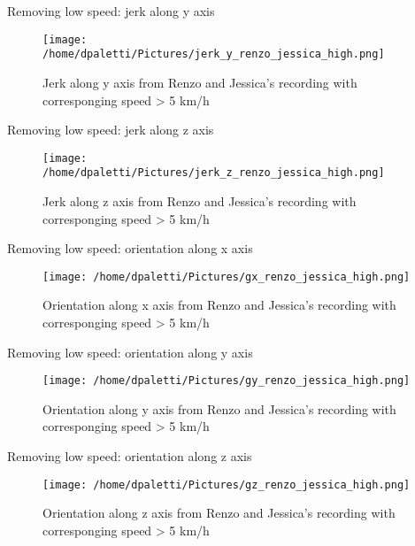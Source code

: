\documentclass[presentation]{beamer}
\begin{document}
\begin{frame}[label={sec:orgcf035dd}]{Removing low speed: jerk along y axis}
\begin{figure}[htbp]
\centering
\texttt{[image: /home/dpaletti/Pictures/jerk\_y\_renzo\_jessica\_high.png]}
\caption{\label{fig:speed_alberto_jessica}Jerk along y axis from Renzo and Jessica's recording with corresponging speed > 5 km/h}
\end{figure}
\end{frame}
\begin{frame}[label={sec:orgcaeba0c}]{Removing low speed: jerk along z axis}
\begin{figure}[htbp]
\centering
\texttt{[image: /home/dpaletti/Pictures/jerk\_z\_renzo\_jessica\_high.png]}
\caption{\label{fig:speed_alberto_jessica}Jerk along z axis from Renzo and Jessica's recording with corresponging speed > 5 km/h}
\end{figure}
\end{frame}
\begin{frame}[label={sec:org3f50e55}]{Removing low speed: orientation along x axis}
\begin{figure}[htbp]
\centering
\texttt{[image: /home/dpaletti/Pictures/gx\_renzo\_jessica\_high.png]}
\caption{\label{fig:speed_alberto_jessica}Orientation along x axis from Renzo and Jessica's recording with corresponging speed > 5 km/h}
\end{figure}
\end{frame}
\begin{frame}[label={sec:orgaf52fc7}]{Removing low speed: orientation along y axis}
\begin{figure}[htbp]
\centering
\texttt{[image: /home/dpaletti/Pictures/gy\_renzo\_jessica\_high.png]}
\caption{\label{fig:speed_alberto_jessica}Orientation along y axis from Renzo and Jessica's recording with corresponging speed > 5 km/h}
\end{figure}
\end{frame}
\begin{frame}[label={sec:orgf390641}]{Removing low speed: orientation along z axis}
\begin{figure}[htbp]
\centering
\texttt{[image: /home/dpaletti/Pictures/gz\_renzo\_jessica\_high.png]}
\caption{\label{fig:speed_alberto_jessica}Orientation along z axis from Renzo and Jessica's recording with corresponging speed > 5 km/h}
\end{figure}
\end{frame}
\end{document}
